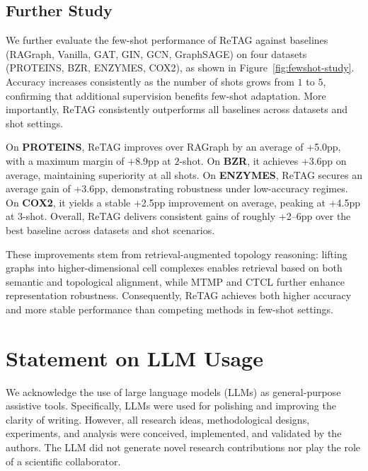 \subsection{Further Study}  

We further evaluate the few-shot performance of ReTAG against baselines (RAGraph, Vanilla, GAT, GIN, GCN, GraphSAGE) on four datasets (PROTEINS, BZR, ENZYMES, COX2), as shown in Figure~\ref{fig:fewshot-study}. Accuracy increases consistently as the number of shots grows from $1$ to $5$, confirming that additional supervision benefits few-shot adaptation. More importantly, ReTAG consistently outperforms all baselines across datasets and shot settings.  

On \textbf{PROTEINS}, ReTAG improves over RAGraph by an average of +5.0pp, with a maximum margin of +8.9pp at $2$-shot. On \textbf{BZR}, it achieves +3.6pp on average, maintaining superiority at all shots. On \textbf{ENZYMES}, ReTAG secures an average gain of +3.6pp, demonstrating robustness under low-accuracy regimes. On \textbf{COX2}, it yields a stable +2.5pp improvement on average, peaking at +4.5pp at $3$-shot. Overall, ReTAG delivers consistent gains of roughly +2--6pp over the best baseline across datasets and shot scenarios.  

These improvements stem from retrieval-augmented topology reasoning: lifting graphs into higher-dimensional cell complexes enables retrieval based on both semantic and topological alignment, while MTMP and CTCL further enhance representation robustness. Consequently, ReTAG achieves both higher accuracy and more stable performance than competing methods in few-shot settings.  







\section{Statement on LLM Usage}
We acknowledge the use of large language models (LLMs) as general-purpose assistive tools. 
Specifically, LLMs were used for polishing and improving the clarity of writing. 
However, all research ideas, methodological designs, experiments, and analysis were conceived, implemented, and validated by the authors. 
The LLM did not generate novel research contributions nor play the role of a scientific collaborator.

